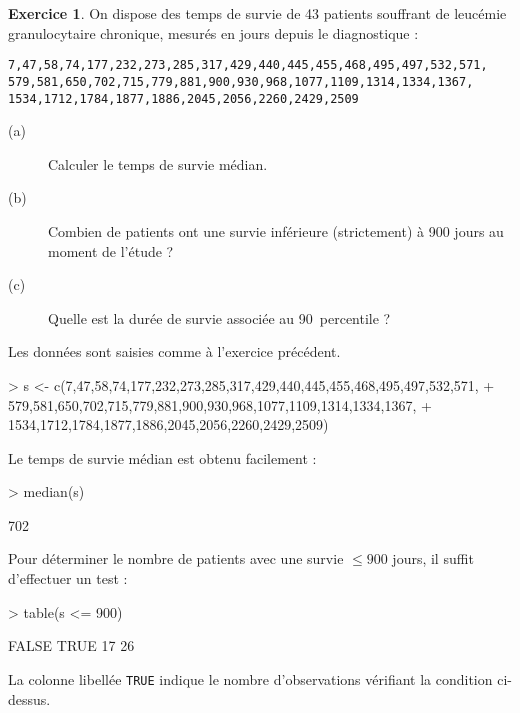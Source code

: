 \documentclass[11pt]{report}
\makeatletter
\theoremstyle{definition}
\newtheorem{exo}{Exercice}[chapter]
\newcommand{\foo}[1]{\texttt{#1}}
\newcommand{\cmd}[1]{\index{#1@\foo{#1}}}
\makeatother
\begin{document}
\begin{exo}\label{exo:2.2}
On dispose des temps de survie de 43 patients souffrant de leucémie
granulocytaire chronique, mesurés en jours depuis le diagnostique :
\autocite[p.~38]{everitt01} 
\begin{verbatim}
7,47,58,74,177,232,273,285,317,429,440,445,455,468,495,497,532,571,
579,581,650,702,715,779,881,900,930,968,1077,1109,1314,1334,1367,
1534,1712,1784,1877,1886,2045,2056,2260,2429,2509
\end{verbatim}
\begin{description}
\item[(a)] Calculer le temps de survie médian. 
\item[(b)] Combien de patients ont une survie inférieure (strictement) à 900
  jours au moment de l'étude ? 
\item[(c)] Quelle est la durée de survie associée au 90\ieme\ percentile ?
\end{description}
\begin{sol}
Les données sont saisies comme à l'exercice précédent.  
\begin{Schunk}
\begin{Sinput}
> s <- c(7,47,58,74,177,232,273,285,317,429,440,445,455,468,495,497,532,571,
+        579,581,650,702,715,779,881,900,930,968,1077,1109,1314,1334,1367,
+        1534,1712,1784,1877,1886,2045,2056,2260,2429,2509)
\end{Sinput}
\end{Schunk}
Le temps de survie médian est obtenu facilement :
\begin{Schunk}
\begin{Sinput}
> median(s)
\end{Sinput}
\begin{Soutput}
[1] 702
\end{Soutput}
\end{Schunk}
\cmd{median}

Pour déterminer le nombre de patients avec une survie $\le 900$ jours, il
suffit d'effectuer un test :
\begin{Schunk}
\begin{Sinput}
> table(s <= 900)
\end{Sinput}
\begin{Soutput}
FALSE  TRUE 
   17    26 
\end{Soutput}
\end{Schunk}
\cmd{table}
La colonne libellée \texttt{TRUE} indique le nombre d'observations vérifiant
la condition ci-dessus. 


\end{sol}
\end{exo}
\end{document}
